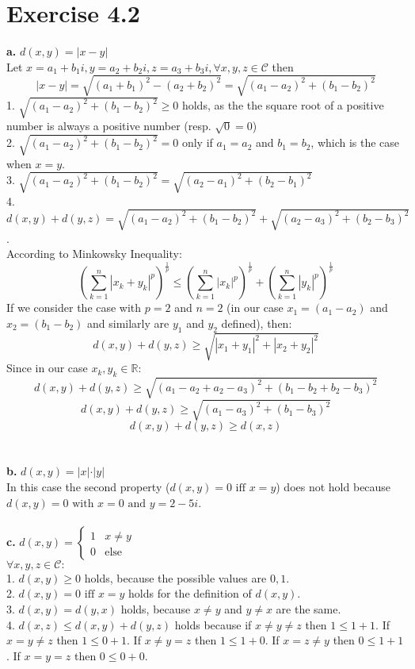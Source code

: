 \documentclass[12pt]{article}
\begin{document}
	\section*{Exercise 4.2}
	\textbf{a.} $d(x,y) = \vert x - y \vert$\\
	Let $x = a_1 + b_1 i, y = a_2 + b_2 i, z = a_3 + b_3 i, \forall x, y, z \in \mathcal{C} $ then
	\begin{equation*}
		\vert x - y \vert = \sqrt{(a_1 + b_1)^2 - (a_2 + b_2)^2} = \sqrt{(a_1 - a_
			2)^2 + (b_1 - b_2)^2}
	\end{equation*}
	1. $\sqrt{(a_1 - a_2)^2 + (b_1 - b_2)^2} \geq 0$ holds, as the the square root of a positive number is always a positive number (resp. $\sqrt0 = 0$)\\
	2. $\sqrt{(a_1 - a_2)^2 + (b_1 - b_2)^2} = 0$ only if $a_1 = a_2$ and $b_1 = b_2$, which is the case when $x=y$.\\
	3. $\sqrt{(a_1 - a_2)^2 + (b_1 - b_2)^2} = \sqrt{(a_2 - a_1)^2 + (b_2 - b_1)^2}$\\
	4. $d(x,y) + d(y,z) = \sqrt{(a_1 - a_2)^2 + (b_1 - b_2)^2} + \sqrt{(a_2 - a_3)^2 + (b_2 - b_3)^2}$.\\
	According to Minkowsky Inequality:
	\begin{equation*}
	\left(\sum _{{k=1}}^{n}|x_{k}+y_{k}|^{p}\right)^{{{\frac  {1}{p}}}}\leq \left(\sum _{{k=1}}^{n}|x_{k}|^{p}\right)^{{{\frac  {1}{p}}}}+\left(\sum _{{k=1}}^{n}|y_{k}|^{p}\right)^{{{\frac  {1}{p}}}}
	\end{equation*}
	If we consider the case with $p=2$ and $n=2$ (in our case $x_1 = (a_1 - a_2)$ and $x_2 = (b_1 - b_2)$ and similarly are $y_1$ and $y_2$ defined), then:
	$$d(x,y) + d(y,z) \geq \sqrt{|x_1 + y_1|^2 + |x_2 + y_2|^2}  $$
	Since in our case $x_k,y_k \in \mathbb{R}$:
	$$d(x,y) + d(y,z) \geq \sqrt{(a_1 - a_2 + a_2 - a_3)^2 + (b_1 - b_2 + b_2 - b_3)^2}  $$
	$$d(x,y) + d(y,z) \geq \sqrt{(a_1 - a_3)^2 + (b_1 - b_3)^2}  $$
	$$d(x,y) + d(y,z)  \geq d(x,z)$$\\\\
	\textbf{b.} $d(x,y) = \vert x \vert \cdot \vert y \vert$\\
	In this case the second property ($d(x, y) = 0 \text{ iff } x = y$) does not hold because $d(x,y) = 0 \text{ with } x = 0 \text{ and } y = 2 - 5i$.\\\\
	\textbf{c.} $d(x,y) = \begin{cases} 1 & x \neq y\\ 0 & \mbox{else} \end{cases}$\\
	$\forall x, y, z \in \mathcal{C}:$\\
	1. $d(x,y) \geq 0$ holds, because the possible values are $0,1$.\\
	2. $d(x, y) = 0 \text{ iff } x = y$ holds for the definition of $d(x,y)$.\\
	3. $d(x, y) = d(y,x)$ holds, because $x \neq y$ and $y \neq x$ are the same.\\
	4. $d(x, z) \leq d(x, y) + d(y, z)$ holds because if $ x \neq y \neq z$ then $1 \leq 1 + 1$. If $x = y \neq z$ then $1 \leq 0 + 1$. If $x \neq y = z$ then $1 \leq 1 + 0$. If $x = z \neq y$ then $0 \leq 1 + 1$. If $x = y = z$ then $0 \leq 0 + 0$.
	
\end{document}
